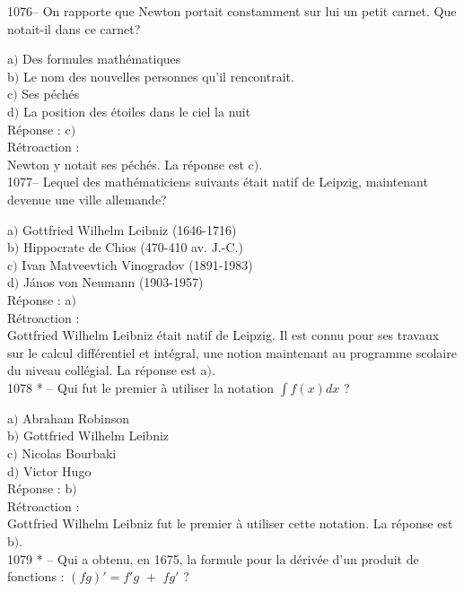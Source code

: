 ﻿\documentclass[letterpaper, 12pt]{article}
\begin{document}
1076-- On rapporte que Newton portait constamment sur lui un petit
carnet. Que notait-il dans ce carnet?

a$)$ Des formules math\'ematiques \\
b$)$ Le nom des nouvelles personnes qu'il rencontrait.  \\
c$)$ Ses p\'ech\'es  \\
d$)$ La position des \'etoiles dans le ciel la nuit\\

R\'eponse : c$)$\\

R\'etroaction : \\
Newton y notait ses p\'ech\'es.
La r\'eponse est c$)$.\\

1077-- Lequel des math\'ematiciens suivants \'etait natif de
Leipzig, maintenant devenue une ville allemande?

a$)$ Gottfried Wilhelm Leibniz (1646-1716) \\
b$)$ Hippocrate de Chios (470-410 av. J.-C.) \\
c$)$ Ivan Matveevtich Vinogradov (1891-1983) \\
d$)$ J\'anos von Neumann (1903-1957) \\

R\'eponse : a$)$\\

R\'etroaction : \\
Gottfried Wilhelm Leibniz \'etait natif de Leipzig. Il est connu
pour ses travaux sur le calcul diff\'erentiel et int\'egral, une
notion maintenant au programme scolaire du niveau coll\'egial.
La r\'eponse est a$)$.\\

1078 * -- Qui fut le premier \`a utiliser la notation $\int f(x)dx$ ?

a$)$ Abraham Robinson \\
b$)$ Gottfried Wilhelm Leibniz \\
c$)$ Nicolas Bourbaki \\
d$)$ Victor Hugo\\

R\'eponse : b$)$\\

R\'etroaction : \\
Gottfried Wilhelm Leibniz fut le premier \`a utiliser cette
notation.
La r\'eponse est b$)$.\\

1079 * -- Qui a obtenu, en 1675, la formule pour la d\'eriv\'ee d'un
produit de fonctions : $(fg)'=f'g\,\,+\,\,fg'$ ?
\end{document}

